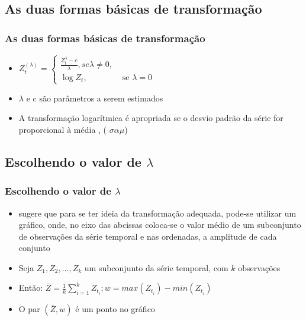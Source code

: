\documentclass{beamer}
\begin{document}
	\subsection{As duas formas básicas de transformação}
	\begin{frame}
		\frametitle{As duas formas básicas de transformação}
		\begin{itemize}
			\item<1-> $	Z_{t}^{(\lambda)} = 
			\begin{cases}
				\frac{Z_{t}^{\lambda}-c}{\lambda}, se \lambda \neq 0,   \\
				
				\log{Z_{t}}, & \mbox{ se } \lambda = 0
			\end{cases}
			$		
		\end{itemize}
		\begin{itemize} 
			\item<1-> $\lambda$ e c são parâmetros a serem estimados
		\end{itemize}
		\begin{itemize} 
			\item<1->A transformação logarítmica é apropriada se o desvio padrão da série for proporcional à média , ( $\sigma \alpha \mu $)\cite{morettin2018analise}
		\end{itemize}
	\end{frame}
	\subsection{Escolhendo o valor de $\lambda$}
	\begin{frame}
		\frametitle{Escolhendo o valor de $\lambda$}
		\begin{itemize}
			\item<1-> \cite{morettin2018analise} sugere que para se ter ideia da transformação adequada, pode-se utilizar um gráfico, onde, no eixo das abcissas coloca-se o valor médio de um subconjunto de observações da série temporal e nas ordenadas, a amplitude de cada conjunto
			\item<1-> Seja $Z_{1},Z_{2},\dots,Z_{k}$ um subconjunto da série temporal, com $k$ observações
			\item<1-> Então: $ \bar{Z} = \frac{1}{k}\sum_{i=1}^{k} Z_{t_{i}} ; w= max(Z_{t_{i}}) - min(Z_{t_{i}})$
			\item<1-> O par $(\bar{Z},w)$ é um ponto no gráfico
		\end{itemize}
	\end{frame}
\end{document}
